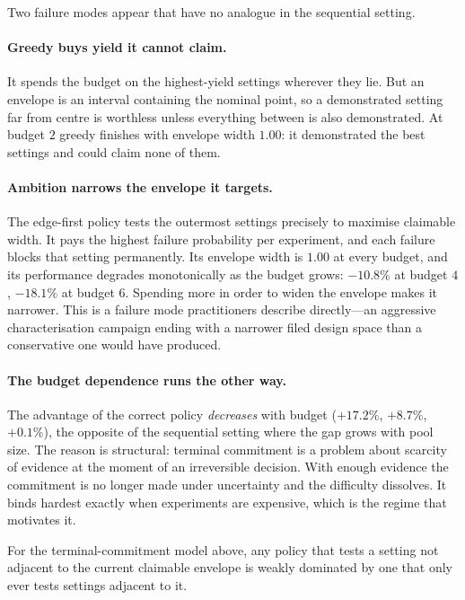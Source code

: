 Two failure modes appear that have no analogue in the sequential setting.

\paragraph{Greedy buys yield it cannot claim.} It spends the budget on the
highest-yield settings wherever they lie. But an envelope is an interval containing
the nominal point, so a demonstrated setting far from centre is worthless unless
everything between is also demonstrated. At budget $2$ greedy finishes with
envelope width $1.00$: it demonstrated the best settings and could claim none of
them.

\paragraph{Ambition narrows the envelope it targets.} The edge-first policy tests
the outermost settings precisely to maximise claimable width. It pays the highest
failure probability per experiment, and each failure blocks that setting
permanently. Its envelope width is $1.00$ at every budget, and its performance
degrades monotonically as the budget grows: $-10.8\%$ at budget $4$, $-18.1\%$ at
budget $6$. Spending more in order to widen the envelope makes it narrower. This is
a failure mode practitioners describe directly---an aggressive characterisation
campaign ending with a narrower filed design space than a conservative one would
have produced.

\paragraph{The budget dependence runs the other way.} The advantage of the correct
policy \emph{decreases} with budget ($+17.2\%$, $+8.7\%$, $+0.1\%$), the opposite
of the sequential setting where the gap grows with pool size. The reason is
structural: terminal commitment is a problem about scarcity of evidence at the
moment of an irreversible decision. With enough evidence the commitment is no
longer made under uncertainty and the difficulty dissolves. It binds hardest
exactly when experiments are expensive, which is the regime that motivates it.

\begin{theorem}
\label{thm:boundary}
For the terminal-commitment model above, any policy that tests a setting not
adjacent to the current claimable envelope is weakly dominated by one that
only ever tests settings adjacent to it.
\end{theorem}

